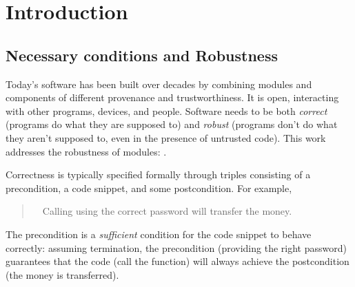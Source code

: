 \section{Introduction}
\label{s:intro}

\subsection{Necessary conditions and Robustness} 
Today's   software has been built 
over decades by combining modules and components of
different provenance and 
trustworthiness. It 
is open, interacting with other programs, devices, and people.
{Software needs} to be both  {\emph{correct}} ({programs do what they are supposed to}) and  %
{\emph{robust}} ({programs don't do what they aren't supposed to, even in the presence of untrusted code}). %
 {This work  addresses the robustness of modules: .}

 {Correctness is} typically specified formally 
 through  triples consisting of a  precondition, a code snippet, and some
 postcondition. 
 For example, 
 \begin{quote}
\Scorrect\ \ Calling  using the correct password will transfer the money.
\end{quote}
The precondition is a \emph{sufficient} condition for the {code snippet to behave correctly}: 
assuming termination, the precondition (\eg providing the right 
password) guarantees that
the code (\eg call the  function)
will always achieve the postcondition (the money is transferred).


    \vspace{.03in}
 
